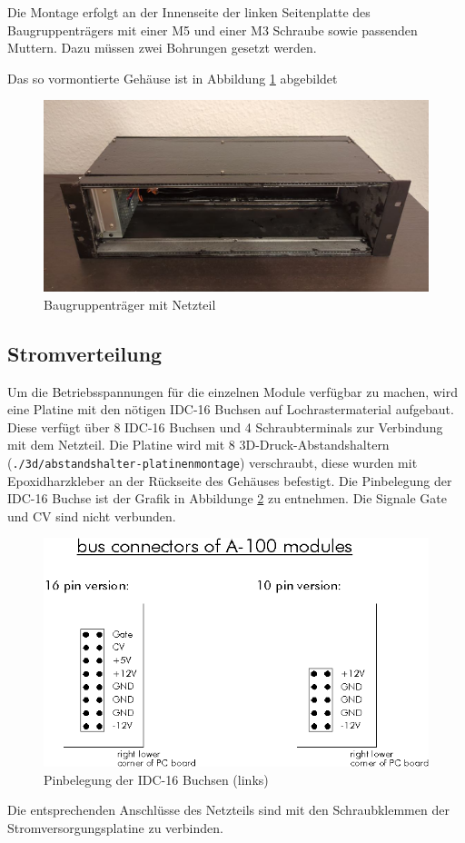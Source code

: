 Die Montage erfolgt an der Innenseite der linken Seitenplatte des Baugruppenträgers mit einer M5 und einer M3 Schraube sowie passenden Muttern. Dazu müssen zwei Bohrungen gesetzt werden.

Das so vormontierte Gehäuse ist in Abbildung \ref{fig:baugruppentraeger} abgebildet
\begin{figure}[h]
    \centering
    \includegraphics[width=1 \linewidth]{Images/baugruppentraeger1.png}
    \caption{Baugruppenträger mit Netzteil}
    \label{fig:baugruppentraeger}
\end{figure}

\subsection*{Stromverteilung}
Um die Betriebsspannungen für die einzelnen Module verfügbar zu machen, wird eine Platine mit den nötigen IDC-16 Buchsen auf Lochrastermaterial aufgebaut.
Diese verfügt über 8 IDC-16 Buchsen und 4 Schraubterminals zur Verbindung mit dem Netzteil.
Die Platine wird mit 8 3D-Druck-Abstandshaltern (\texttt{./3d/abstandshalter-platinenmontage}) verschraubt, diese wurden mit Epoxidharzkleber an der Rückseite des Gehäuses befestigt.
Die Pinbelegung der IDC-16 Buchse ist der Grafik in Abbildunge \ref{fig:idc16} zu entnehmen. Die Signale Gate und CV sind nicht verbunden.

\begin{figure}[h]
    \centering
    \includegraphics[width= 0.7\linewidth]{Images/idc16.png}
    \caption[Pinbelegung der IDC-16 Buchsen]{Pinbelegung der IDC-16 Buchsen (links)}
    \label{fig:idc16}
\end{figure}
Die entsprechenden Anschlüsse des Netzteils sind mit den Schraubklemmen der Stromversorgungsplatine zu verbinden.

